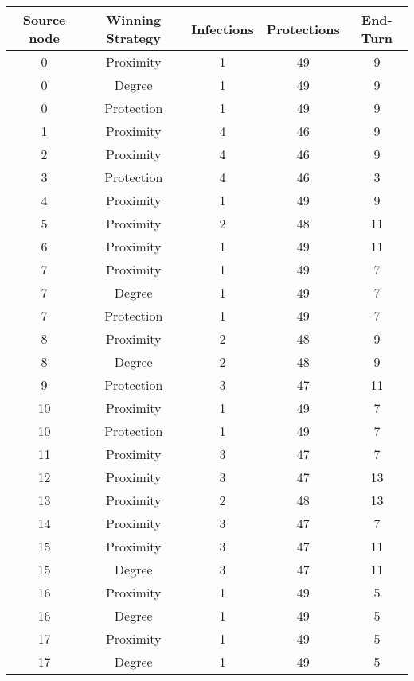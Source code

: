 \documentclass[results.tex]{subfiles}
\begin{document}
\begin{center}
  \begin{tabular}{| c || c | c | c | c |}
    \hline
    {\bfseries Source node} & {\bfseries Winning Strategy} & {\bfseries Infections} & {\bfseries Protections} & {\bfseries End-Turn} \\  %
    \hline\hline
    0 & Proximity & 1 & 49 & 9 \\ 
    \hline
    0 & Degree & 1 & 49 & 9 \\ 
    \hline
    0 & Protection & 1 & 49 & 9 \\ 
    \hline
    1 & Proximity & 4 & 46 & 9 \\ 
    \hline
    2 & Proximity & 4 & 46 & 9 \\ 
    \hline
    3 & Protection & 4 & 46 & 3 \\ 
    \hline
    4 & Proximity & 1 & 49 & 9 \\ 
    \hline
    5 & Proximity & 2 & 48 & 11 \\ 
    \hline
    6 & Proximity & 1 & 49 & 11 \\ 
    \hline
    7 & Proximity & 1 & 49 & 7 \\ 
    \hline
    7 & Degree & 1 & 49 & 7 \\ 
    \hline
    7 & Protection & 1 & 49 & 7 \\ 
    \hline
    8 & Proximity & 2 & 48 & 9 \\ 
    \hline
    8 & Degree & 2 & 48 & 9 \\ 
    \hline
    9 & Protection & 3 & 47 & 11 \\ 
    \hline
    10 & Proximity & 1 & 49 & 7 \\ 
    \hline
    10 & Protection & 1 & 49 & 7 \\ 
    \hline
    11 & Proximity & 3 & 47 & 7 \\ 
    \hline
    12 & Proximity & 3 & 47 & 13 \\ 
    \hline
    13 & Proximity & 2 & 48 & 13 \\ 
    \hline
    14 & Proximity & 3 & 47 & 7 \\ 
    \hline
    15 & Proximity & 3 & 47 & 11 \\ 
    \hline
    15 & Degree & 3 & 47 & 11 \\ 
    \hline
    16 & Proximity & 1 & 49 & 5 \\ 
    \hline
    16 & Degree & 1 & 49 & 5 \\ 
    \hline
    17 & Proximity & 1 & 49 & 5 \\ 
    \hline
    17 & Degree & 1 & 49 & 5 \\ 

\end{tabular}
\end{center}
\end{document}
